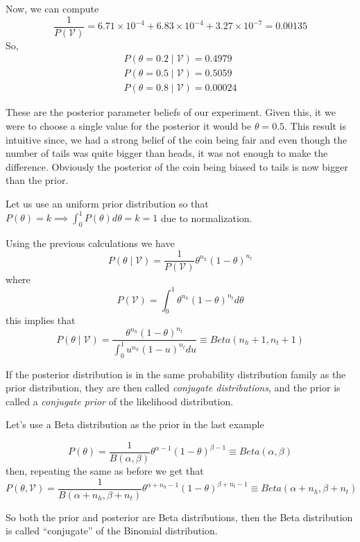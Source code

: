 \begin{exampleth}
Now, we can compute
\[
   \frac{1}{P(\mathcal{V})} =  6.71\times10^{-4} +   6.83\times10^{-4} +
   3.27\times10^{-7} = 0.00135
 \]
 So,
\begin{gather*}
  P(\theta = 0.2  \mid  \mathcal{V}) = 0.4979\\
  P(\theta = 0.5  \mid  \mathcal{V}) = 0.5059\\
  P(\theta = 0.8  \mid  \mathcal{V}) = 0.00024
\end{gather*}

These are the posterior parameter beliefs of our experiment. Given this, it we
were to choose a single value for the posterior it would be \(\theta = 0.5\).
This result is intuitive since, we had a strong belief of the coin being fair
and even though the number of tails was quite bigger than heads, it
was not enough to make the difference. Obviously the posterior of the coin being
biased to tails is now bigger than the prior.

Let us use an uniform prior distribution so that \(P(\theta) = k \implies \int_0^1 P(\theta) d\theta
= k = 1\) due to normalization.

Using the previous calculations we have
\[
  P(\theta \mid  \mathcal{V}) = \frac{1}{P(\mathcal{V})} \theta^{n_h}(1-\theta)^{n_t}
\]
where
\[
  P(\mathcal{V}) = \int_0^1 \theta^{n_h}(1-\theta)^{n_t} d\theta
\]
this implies that
\[
  P(\theta \mid \mathcal{V}) = \frac{\theta^{n_h}(1-\theta)^{n_t} }{ \int_0^1 u^{n_h}(1-u)^{n_t}
    du}\equiv Beta(n_h + 1, n_t + 1)
\]
\end{exampleth}

\begin{definition}
If the posterior distribution is in the same probability distribution family as
the prior distribution, they are then called \emph{conjugate distributions}, and
the prior is called a \emph{conjugate prior} of the likelihood distribution.
\end{definition}

Let's use a Beta distribution as the prior in the last example

\[
  P(\theta) = \frac{1}{B(\alpha, \beta)}\theta^{\alpha - 1}(1 - \theta)^{\beta -
    1} \equiv Beta(\alpha, \beta)
\]
then, repeating the same as before we get that
\[
  P(\theta, \mathcal{V}) = \frac{1}{B(\alpha + n_h, \beta + n_t)}\theta^{\alpha
    + n_h - 1}(1 - \theta)^{\beta + n_t - 1} \equiv Beta(\alpha + n_h, \beta + n_t)
\]

So both the prior and posterior are Beta distributions, then the Beta
distribution is called ``conjugate'' of the Binomial distribution.


